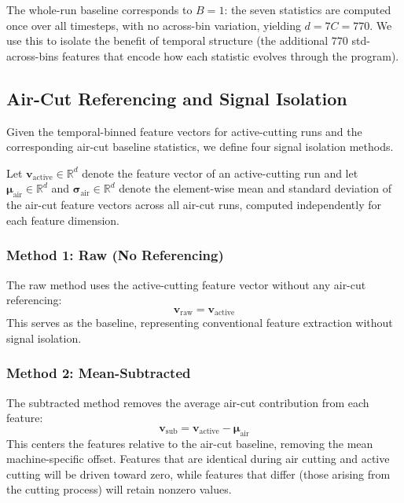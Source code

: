 The whole-run baseline corresponds to $B = 1$: the seven statistics are computed once over all timesteps, with no across-bin variation, yielding $d = 7C = 770$. We use this to isolate the benefit of temporal structure (the additional $770$ std-across-bins features that encode how each statistic evolves through the program).

\subsection{Air-Cut Referencing and Signal Isolation}\label{sec:signal_isolation}

Given the temporal-binned feature vectors for active-cutting runs and the corresponding air-cut baseline statistics, we define four signal isolation methods.

Let $\mathbf{v}_\text{active} \in \mathbb{R}^d$ denote the feature vector of an active-cutting run and let $\boldsymbol{\mu}_\text{air} \in \mathbb{R}^d$ and $\boldsymbol{\sigma}_\text{air} \in \mathbb{R}^d$ denote the element-wise mean and standard deviation of the air-cut feature vectors across all air-cut runs, computed independently for each feature dimension.

\subsubsection{Method 1: Raw (No Referencing)}

The raw method uses the active-cutting feature vector without any air-cut referencing:
\begin{equation}\label{eq:raw}
    \mathbf{v}_\text{raw} = \mathbf{v}_\text{active}
\end{equation}
This serves as the baseline, representing conventional feature extraction without signal isolation.

\subsubsection{Method 2: Mean-Subtracted}

The subtracted method removes the average air-cut contribution from each feature:
\begin{equation}\label{eq:subtracted}
    \mathbf{v}_\text{sub} = \mathbf{v}_\text{active} - \boldsymbol{\mu}_\text{air}
\end{equation}
This centers the features relative to the air-cut baseline, removing the mean machine-specific offset. Features that are identical during air cutting and active cutting will be driven toward zero, while features that differ (those arising from the cutting process) will retain nonzero values.

